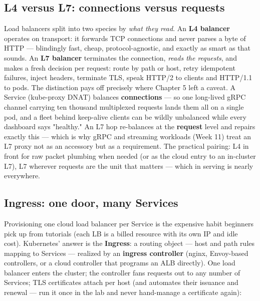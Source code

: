 \subsection*{L4 versus L7: connections versus requests}

Load balancers split into two species by \textit{what they read}. An \textbf{L4 balancer} operates on transport: it forwards TCP connections and never parses a byte of HTTP — blindingly fast, cheap, protocol-agnostic, and exactly as smart as that sounds. An \textbf{L7 balancer} terminates the connection, \textit{reads the requests}, and makes a fresh decision per request: route by path or host, retry idempotent failures, inject headers, terminate TLS, speak HTTP/2 to clients and HTTP/1.1 to pods. The distinction pays off precisely where Chapter 5 left a caveat. A Service (kube-proxy DNAT) balances \textbf{connections} — so one long-lived gRPC channel carrying ten thousand multiplexed requests lands them all on a single pod, and a fleet behind keep-alive clients can be wildly unbalanced while every dashboard says "healthy." An L7 hop re-balances at the \textbf{request} level and repairs exactly this — which is why gRPC and streaming workloads (Week 11) treat an L7 proxy not as an accessory but as a requirement. The practical pairing: L4 in front for raw packet plumbing when needed (or as the cloud entry to an in-cluster L7), L7 wherever requests are the unit that matters — which in serving is nearly everywhere.

\subsection*{Ingress: one door, many Services}

Provisioning one cloud load balancer per Service is the expensive habit beginners pick up from tutorials (each LB is a billed resource with its own IP and idle cost). Kubernetes' answer is the \textbf{Ingress}: a routing object — host and path rules mapping to Services — realized by an \textbf{ingress controller} (nginx, Envoy-based controllers, or a cloud controller that programs an ALB directly). One load balancer enters the cluster; the controller fans requests out to any number of Services; TLS certificates attach per host (and  automates their issuance and renewal — run it once in the lab and never hand-manage a certificate again):


